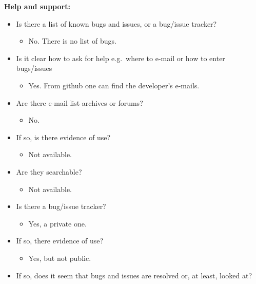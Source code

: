 \textbf{Help and support:}

\begin{itemize}
\itemsep1pt\parskip0pt
\item
  Is there a list of known bugs and issues, or a bug/issue tracker?

  \begin{itemize}
  \itemsep1pt\parskip0pt
  \item
    No. There is no list of bugs.
  \end{itemize}
\item
  Is it clear how to ask for help e.g.~where to e-mail or how to enter
  bugs/issues

  \begin{itemize}
  \itemsep1pt\parskip0pt
  \item
    Yes. From github one can find the developer's e-mails.
  \end{itemize}
\item
  Are there e-mail list archives or forums?

  \begin{itemize}
  \itemsep1pt\parskip0pt
  \item
    No.
  \end{itemize}
\item
  If so, is there evidence of use?

  \begin{itemize}
  \itemsep1pt\parskip0pt
  \item
    Not available.
  \end{itemize}
\item
  Are they searchable?

  \begin{itemize}
  \itemsep1pt\parskip0pt
  \item
    Not available.
  \end{itemize}
\item
  Is there a bug/issue tracker?

  \begin{itemize}
  \itemsep1pt\parskip0pt
  \item
    Yes, a private one.
  \end{itemize}
\item
  If so, there evidence of use?

  \begin{itemize}
  \itemsep1pt\parskip0pt
  \item
    Yes, but not public.
  \end{itemize}
\item
  If so, does it seem that bugs and issues are resolved or, at least,
  looked at?


\end{itemize}
